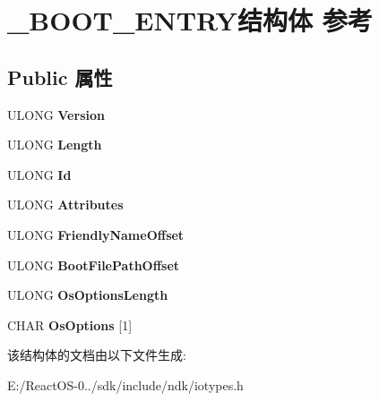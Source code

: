 \hypertarget{struct___b_o_o_t___e_n_t_r_y}{}\section{\+\_\+\+B\+O\+O\+T\+\_\+\+E\+N\+T\+R\+Y结构体 参考}
\label{struct___b_o_o_t___e_n_t_r_y}
\subsection*{Public 属性}
\begin{DoxyCompactItemize}
\item 
\mbox{\label{struct___b_o_o_t___e_n_t_r_y_ab8b2d0f6b6a1673fe02cd2fe8ace5865}} 
U\+L\+O\+NG {\bfseries Version}
\item 
\mbox{\label{struct___b_o_o_t___e_n_t_r_y_a360c9fc7a166c7bbd26d895eb5d71b88}} 
U\+L\+O\+NG {\bfseries Length}
\item 
\mbox{\label{struct___b_o_o_t___e_n_t_r_y_afafb040d03f71bd5059c10e3c726544c}} 
U\+L\+O\+NG {\bfseries Id}
\item 
\mbox{\label{struct___b_o_o_t___e_n_t_r_y_a56e2412d90a1b526c5fbd2c927e4cbcd}} 
U\+L\+O\+NG {\bfseries Attributes}
\item 
\mbox{\label{struct___b_o_o_t___e_n_t_r_y_a0130f507de8ddfa5ebd8dc95cdbfbd45}} 
U\+L\+O\+NG {\bfseries Friendly\+Name\+Offset}
\item 
\mbox{\label{struct___b_o_o_t___e_n_t_r_y_ad278bd1a1803a4d9c7fc4eb4d7a476f2}} 
U\+L\+O\+NG {\bfseries Boot\+File\+Path\+Offset}
\item 
\mbox{\label{struct___b_o_o_t___e_n_t_r_y_a4447d0fc3edf3a37938bacfcf52e521c}} 
U\+L\+O\+NG {\bfseries Os\+Options\+Length}
\item 
\mbox{\label{struct___b_o_o_t___e_n_t_r_y_adce134ee333a950b504fd3a43fb6ecfd}} 
C\+H\+AR {\bfseries Os\+Options} \mbox{[}1\mbox{]}
\end{DoxyCompactItemize}


该结构体的文档由以下文件生成\+:\begin{DoxyCompactItemize}
\item 
E\+:/\+React\+O\+S-\/0../sdk/include/ndk/iotypes.\+h\end{DoxyCompactItemize}
